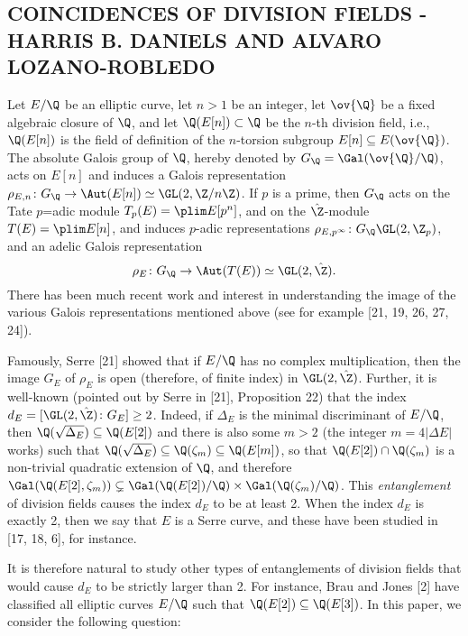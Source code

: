 





\subsection{COINCIDENCES OF DIVISION FIELDS - HARRIS B. DANIELS AND ALVARO LOZANO-ROBLEDO}

Let $E/\Q$ be an elliptic curve, let $n > 1$ be an integer, let $\ov{\Q}$ be a fixed algebraic closure of $\Q$, and let $\Q(E[n]) \subset \Q$ be the $n$-th division field, i.e., $\Q(E[n])$ is the field of definition of the $n$-torsion subgroup $E[n] \subseteq E(\ov{\Q})$. The absolute Galois group of $\Q$, hereby denoted by $G_\Q= \Gal(\ov{\Q}/\Q)$, acts on $E[n]$ and induces a Galois representation $\rho_{E,n} \colon G_\Q \to \Aut(E[n]) \simeq \GL(2,\Z/n\Z)$. If $p$ is a prime, then $G_\Q$ acts on the Tate $p$=adic module $T_p(E)= \plim E[p^n]$, and on the $\hat{\Z}$-module $T(E)= \plim E[n]$, and induces $p$-adic representations $\rho_{E,p^\infty} \colon G_\Q \GL(2,\Z_p)$, and an adelic Galois representation
	\[
	\rho_E \colon G_\Q \to \Aut(T(E)) \simeq \GL(2, \hat{\Z}). 
	\]
There has been much recent work and interest in understanding the image of the various Galois representations mentioned above (see for example [21, 19, 26, 27, 24]). 


Famously, Serre [21] showed that if $E/\Q$ has no complex multiplication, then the image $G_E$ of $\rho_E$ is open (therefore, of finite index) in $\GL(2, \hat{\Z})$. Further, it is well-known (pointed out by Serre in [21], Proposition 22) that the index $d_E= [\GL(2, \hat{\Z}) \colon G_E] \geq 2$. Indeed, if $\Delta_E$ is the minimal discriminant of $E/\Q$, then $\Q(\sqrt{\Delta_E}) \subseteq \Q(E[2])$ and there is also some $m > 2$ (the integer $m= 4 |\Delta E|$ works) such that $\Q(\sqrt{\Delta_E}) \subseteq \Q(\zeta_m) \subseteq \Q(E[m])$, so that $\Q(E[2]) \cap \Q(\zeta_m)$ is a non-trivial quadratic extension of $\Q$, and therefore $\Gal(\Q(E[2], \zeta_m)) \subsetneq \Gal(\Q(E[2])/\Q) \times \Gal(\Q(\zeta_m)/\Q)$. This \textit{entanglement} of division fields causes the index $d_E$ to be at least 2. When the index $d_E$ is exactly 2, then we say that $E$ is a Serre curve, and these have been studied in [17, 18, 6], for instance.


It is therefore natural to study other types of entanglements of division fields that would cause $d_E$ to be strictly larger than 2. For instance, Brau and Jones [2] have classified all elliptic curves $E/\Q$ such that $\Q(E[2]) \subseteq \Q(E[3])$. In this paper, we consider the following question:


